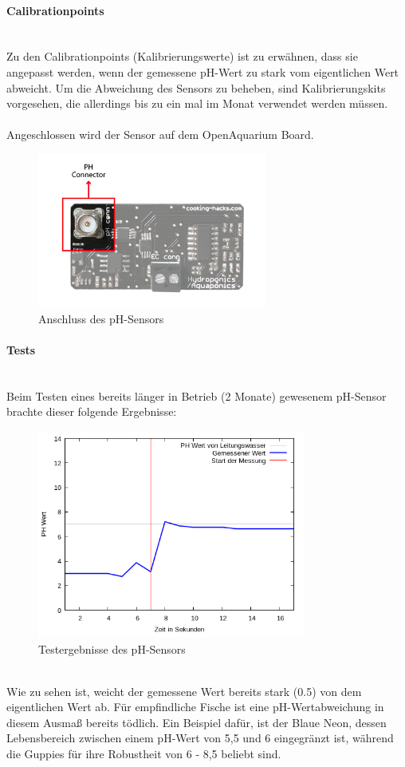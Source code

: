 \paragraph{Calibrationpoints} \mbox{} \\
Zu den Calibrationpoints (Kalibrierungswerte) ist zu erwähnen, dass sie angepasst werden, wenn der gemessene pH-Wert zu stark vom eigentlichen Wert abweicht. Um die Abweichung des Sensors zu beheben, sind Kalibrierungskits vorgesehen, die allerdings bis zu ein mal im Monat verwendet werden m\"ussen. \\ \mbox{} \\
\newpage 
Angeschlossen wird der Sensor auf dem OpenAquarium Board. \\
\begin{figure}[ht]
    \centering
    \includegraphics[height=2.0in]{images/ph_sensor_connection}
    \caption{Anschluss des pH-Sensors}
\end{figure}

\paragraph{Tests} \mbox{} \\
Beim Testen eines bereits l\"anger in Betrieb (2 Monate) gewesenem pH-Sensor brachte dieser folgende Ergebnisse: \\
\begin{figure}[ht]
    \centering
    \includegraphics[height=2.7in]{images/ph_tests}
    \caption{Testergebnisse des pH-Sensors}
\end{figure} \\
Wie zu sehen ist, weicht der gemessene Wert bereits stark (0.5) von dem eigentlichen Wert ab. Für empfindliche Fische ist eine pH-Wertabweichung in diesem Ausmaß bereits tödlich. Ein Beispiel dafür, ist der Blaue Neon, dessen Lebensbereich zwischen einem pH-Wert von 5,5 und 6 eingegränzt ist, während die Guppies für ihre Robustheit von 6 - 8,5 beliebt sind. 
